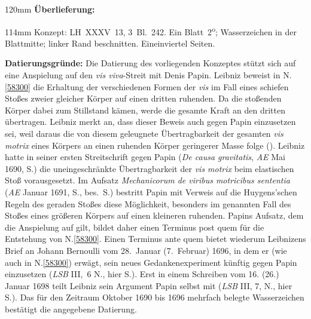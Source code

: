 \begin{ledgroupsized}[r]{120mm}
\footnotesize
\pstart
\noindent\textbf{Überlieferung:}
\pend
\end{ledgroupsized}
\begin{ledgroupsized}[r]{114mm}
\footnotesize
\pstart \parindent -6mm
%
Konzept:
LH~XXXV~13, 3~Bl.~242. 
Ein Blatt~2\textsuperscript{o};
Wasserzeichen		%
in der Blattmitte;
linker Rand beschnitten.
Eineinviertel Seiten.
\pend 
\end{ledgroupsized}
\vspace{5mm}
\begin{ledgroup}
\footnotesize
\pstart
\noindent%
\textbf{Datierungsgründe:}
Die Datierung des vorliegenden Konzeptes stützt sich auf eine Anspielung auf den \textit{vis viva}-Streit mit 
Denis Papin.
Leibniz beweist in N.\;\ref{58300} die Erhaltung der verschiedenen Formen der \textit{vis} im Fall eines schiefen Stoßes zweier gleicher Körper auf einen dritten ruhenden. 
Da die stoßenden Körper dabei zum Stillstand kämen, werde die gesamte Kraft an den dritten übertragen.
Leibniz merkt an, dass dieser Beweis auch gegen Papin einzusetzen sei, weil daraus die 
von diesem geleugnete
Übertragbarkeit der gesamten \textit{vis motrix} eines Körpers an einen ruhenden Körper geringerer Masse folge ().
Leibniz hatte in seiner ersten Streitschrift gegen Papin
(\cite{02040}\textit{De causa gravitatis}, \cite{01023}\textit{AE} Mai 1690, S.)
die uneingeschränkte Übertragbarkeit der \textit{vis motrix} beim elastischen Stoß vorausgesetzt.
Im Aufsatz 
\cite{00537}\textit{Mechanicorum de viribus motricibus sententia} (\cite{01023}\textit{AE} Januar 1691, S., bes.\ S.)
bestritt Papin 
mit Verweis auf die
Huygens'schen Regeln des geraden Stoßes
diese Möglichkeit,
besonders im genannten Fall des Stoßes eines größeren Körpers auf einen kleineren ruhenden.
Papins Aufsatz, dem die Anspielung auf  gilt, bildet daher einen Terminus post quem für die Entstehung von N.\;\ref{58300}.
Einen Terminus ante quem bietet wiederum Leibnizens
\cite{02146}Brief an Johann Bernoulli vom 28.~Januar (7.~Februar) 1696,
in dem er 
(wie auch in N.\;\ref{58300})
erwägt, sein neues Gedankenexperiment künftig gegen Papin einzusetzen
(\textit{LSB} III,~6 N., hier S.).
Erst in einem \cite{02073}Schreiben vom 16. (26.) Januar 1698 teilt Leibniz sein Argument Papin selbst mit 
(\textit{LSB} III, 7, N., hier S.).
\pend
\pstart
Das für den Zeitraum Oktober 1690 bis 
1696 mehrfach belegte Wasserzeichen bestätigt die angegebene Datierung. %
\pend
\end{ledgroup}
